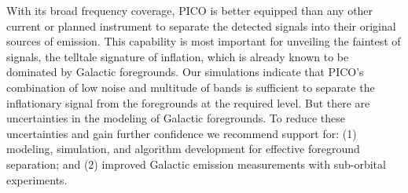 \documentclass[PICOReport.tex]{subfiles}
\begin{document}

With its broad frequency coverage, PICO is better equipped than any other current or planned instrument to separate the detected signals into their original sources of emission.  This capability is most important for unveiling the faintest of signals, the telltale signature of inflation, which is already known to be dominated by Galactic foregrounds. Our simulations indicate that PICO's combination of low noise and multitude of bands is sufficient to separate the inflationary signal from the foregrounds at the required level. But there are uncertainties in the modeling of Galactic foregrounds. To reduce these uncertainties and gain further confidence we recommend support for: (1) modeling, simulation, and algorithm development for effective foreground separation; and (2) improved Galactic emission measurements with sub-orbital experiments. 

\end{document}
